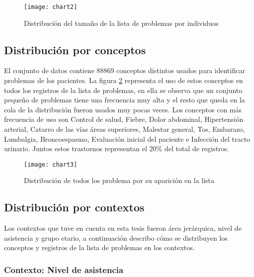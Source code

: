 \begin{figure}[htbp]
\caption{Distribución del tamaño de la lista de problemas por individuos}
\label{fig:listaIndividuos}
\centering
\texttt{[image: chart2]}
\end{figure}

\subsection{Distribución por conceptos}
El conjunto de datos contiene \num{88869} conceptos distintos usados para identificar problemas de los pacientes. La figura \ref{fig:listaProblemas} representa el uso de estos conceptos en todos los registros de la lista de problemas, en ella se observa que un conjunto pequeño de problemas tiene una frecuencia muy alta y el resto que queda en la cola de la distribución fueron usados muy pocas veces. Los conceptos con más frecuencia de uso son Control de salud, Fiebre, Dolor abdominal,  Hipertensión arterial, Catarro de las vías áreas superiores, Malestar general, Tos, Embarazo, Lumbalgia, Broncoespasmo, Evaluación inicial del paciente e Infección del tracto urinario. Juntos estos trastornos representan el \num{20}\% del total de registros. 

\begin{figure}[htbp]
\caption{Distribución de todos los problema por su aparición en la lista}
\label{fig:listaProblemas}
\centering
\texttt{[image: chart3]}
\end{figure}

\subsection{Distribución por contextos}

Los contextos que tuve en cuenta en esta tesis fueron área jerárquica, nivel de asistencia y grupo etario, a continuación describo cómo se distribuyen los conceptos y registros de la lista de problemas en los contextos.


\subsubsection{Contexto: Nivel de asistencia}

